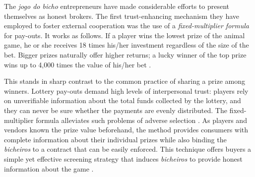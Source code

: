\documentclass[a4paper,12pt]{article}
\begin{document}
The \emph{jogo do bicho} entrepreneurs have made considerable efforts to present themselves as honest brokers. The first trust-enhancing mechanism they have employed to foster external cooperation was the use of a \emph{fixed-multiplier formula} for pay-outs. It works as follows. If a player wins the lowest prize of the animal game, he or she receives 18 times his/her investment regardless of the size of the bet. Bigger prizes naturally offer higher returns; a lucky winner of the top prize wins up to 4,000 times the value of his/her bet \citetext{\citealp[89]{labronici2012paratodos}; \citealp[20]{magalhaes2005ganhou}}.

This stands in sharp contrast to the common practice of sharing a prize among winners. Lottery pay-outs demand high levels of interpersonal trust: players rely on unverifiable information about the total funds collected by the lottery, and they can never be sure whether the payments are evenly distributed. The fixed-multiplier formula alleviates such problems of adverse selection \citep{akerlof1970market, cohen2010testing, levin2001information}. As players and vendors known the prize value beforehand, the method provides consumers with complete information about their individual prizes while also binding the \emph{bicheiros} to a contract that can be easily enforced. This technique offers buyers a simple yet effective screening strategy that induces \emph{bicheiros} to provide honest information about the game \citep{spence1973job, stiglitz1981credit}.
\end{document}
